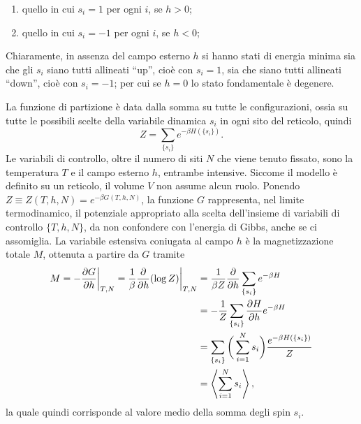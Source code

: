 \begin{enumerate}
    \item quello in cui $s_i = 1$ per ogni $i$, se $h > 0$;
    \item quello in cui $s_i = -1$ per ogni $i$, se $h < 0$;
\end{enumerate}
Chiaramente, in assenza del campo esterno $h$ si hanno stati di energia minima sia che gli $s_i$ siano tutti allineati ``up'', cioè con $s_i = 1$, sia che siano tutti allineati ``down'', cioè con $s_i = -1$; per cui se $h = 0$ lo stato fondamentale è degenere. 

La funzione di partizione è data dalla somma su tutte le configurazioni, ossia su tutte le possibili scelte della variabile dinamica $s_i$ in ogni sito del reticolo, quindi
\begin{equation}
    Z = \sum_{\{s_i\}}e^{-\beta H(\{s_i\})}.
\end{equation}
Le variabili di controllo, oltre il numero di siti $N$ che viene tenuto fissato, sono la temperatura $T$ e il campo esterno $h$, entrambe intensive. Siccome il modello è definito su un reticolo, il volume $V$ non assume alcun ruolo. Ponendo $Z \equiv Z(T,h,N) = e^{-\beta G(T,h,N)}$, la funzione $G$ rappresenta, nel limite termodinamico, il potenziale appropriato alla scelta dell'insieme di variabili di controllo $\{T,h,N\}$, da non confondere con l'energia di Gibbs, anche se ci assomiglia. La variabile estensiva coniugata al campo $h$ è la magnetizzazione totale $M$, ottenuta a partire da $G$ tramite
\begin{equation}
\label{eq: magnetizzazione come media spin}
    \begin{split}
        M = -\frac{\partial G}{\partial h}\bigg|_{T,N} = \frac{1}{\beta}\frac{\partial}{\partial h}(\log{Z})\bigg|_{T,N} &= \frac{1}{\beta Z}\frac{\partial}{\partial h}\sum_{\{s_i\}}e^{-\beta H} \\
        &= -\frac{1}{Z}\sum_{\{s_i\}}\frac{\partial H}{\partial h}e^{-\beta H} \\
        &= \sum_{\{s_i\}}\bigg(\sum_{i=1}^N s_i\bigg)\frac{e^{-\beta H(\{s_i\})}}{Z} \\
        &= \left\langle \sum_{i=1}^N s_i \right\rangle,
    \end{split}
\end{equation}
la quale quindi corrisponde al valore medio della somma degli spin $s_i$.

